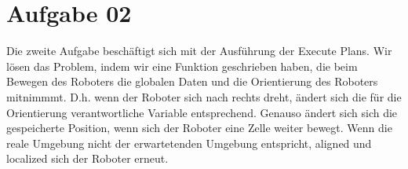 \newpage
\section{Aufgabe 02}
Die zweite Aufgabe besch\"aftigt sich mit der Ausf\"uhrung der Execute Plans.
Wir l\"osen das Problem, indem wir eine Funktion geschrieben haben,
die beim Bewegen des Roboters die globalen Daten und die Orientierung des Roboters mitnimmmt. D.h. wenn der Roboter sich nach rechts dreht, \"andert sich die f\"ur die Orientierung verantwortliche Variable entsprechend. Genauso \"andert sich sich die gespeicherte Position, wenn sich der Roboter eine Zelle weiter bewegt. Wenn die reale Umgebung nicht der erwartetenden Umgebung entspricht, aligned und localized sich der Roboter erneut.